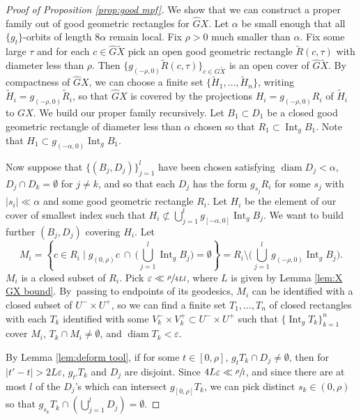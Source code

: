 \documentclass[JEP,XML,SOM,Unicode,NoFloatCountersInSection]{cedram}
\let\epsilon\varepsilon
\let\sep\mid
\theoremstyle{definition}
\numberwithin{equation}{section}
\DeclareMathOperator{\diam}{diam}
\DeclareMathOperator{\Int}{Int}
\begin{document}
\begin{proof}[Proof of Proposition \ref{prop:good mpf}]
We show that we can construct a proper family out of good geometric rectangles for $\hat G X$.
Let $\alpha$ be small enough that all $\{g_t\}$-orbits of length $8\alpha$ remain local. Fix $\rho>0$ much smaller than $\alpha$. Fix some large $\tau$ and for each $c \in \hat G\tilde X$ pick an open good geometric rectangle $\tilde R(c,\tau)$ with diameter less than $\rho$. Then $\{ g_{(-\rho,0)} \tilde R(c, \tau)\}_{c\in G\tilde X}$ is an open cover of $\hat G\tilde X$. By compactness of $\hat GX$, we can choose a finite set $\{ \tilde H_1, \ldots, \tilde H_n\}$, writing $\tilde H_i = g_{(-\rho,0)}\tilde R_i$, so that $\hat GX$ is covered by the projections $H_i= g_{(-\rho,0)} R_i$ of $\tilde H_i$ to $GX$. We build our proper family recursively. Let $B_1 \subset D_1$ be a closed good geometric rectangle of diameter less than $\alpha$ chosen so that $R_1 \subset \Int_g B_1$. Note that $H_1 \subset g_{(-\alpha,0)} \Int_g B_1$.

Now suppose that $\{ (B_j, D_j) \}_{j=1}^l$ have been chosen satisfying $\diam D_j < \alpha$, \hbox{$D_j \cap D_k = \emptyset$} for $j\neq k$, and so that each $D_j$ has the form $g_{s_j}R_i$ for some $s_j$ with $|s_i| \ll  \alpha$ and some good geometric rectangle $R_i$. Let $H_i$ be the element of our cover of smallest index such that $H_i \not\subset \bigcup_{j=1}^l g_{[-\alpha,0]} \Int_g B_j$.
We want to build further $(B_j, D_j)$ covering $H_i$. Let\vspace*{-3pt}\enlargethispage{\baselineskip}%
\[\textstyle
M_i = \left\{ c\in R_i \sep g_{(0,\rho)} c \ \cap \ \big(\bigcup_{j=1}^l \Int_g B_j\big) = \emptyset \right\}
= R_i \setminus \bigl( \bigcup_{j=1}^l g_{(-\rho,0)} \Int_g B_j \bigr).
\]
$M_i$ is a closed subset of $R_i$. Pick $\epsilon \ll  \sfrac{\rho}{4Ll}$, where $L$ is given by Lemma \ref{lem:X GX bound}. By~passing to endpoints of its geodesics, $M_i$ can be identified with a closed subset of $U^-\times U^+$, so we can find a finite set $T_1, \ldots, T_n$ of closed rectangles with each $T_k$ identified with some $V_k^-\times V_k^+ \subset U^-\times U^+$ such that $\{ \Int_g T_k\}_{k=1}^n$ cover $M_i$, $T_k \cap M_i \neq \emptyset$, and $\diam T_k < \epsilon$.

By Lemma \ref{lem:deform tool}, if for some $t\in [0,\rho]$, $g_tT_k \cap D_j \neq \emptyset$, then for $|t'-t|>2L\epsilon$, $g_{t'}T_k$ and $D_j$ are disjoint. Since $4L\epsilon \ll  \sfrac{\rho}{l}$, and since there are at most $l$ of the $D_j$'s which can intersect $g_{[0,\rho]}T_k$, we can pick distinct $s_k \in (0, \rho)$ so that $g_{s_k} T_k \cap ( \bigcup _{j=1}^l D_j ) = \emptyset$.


\end{proof}
\end{document}
